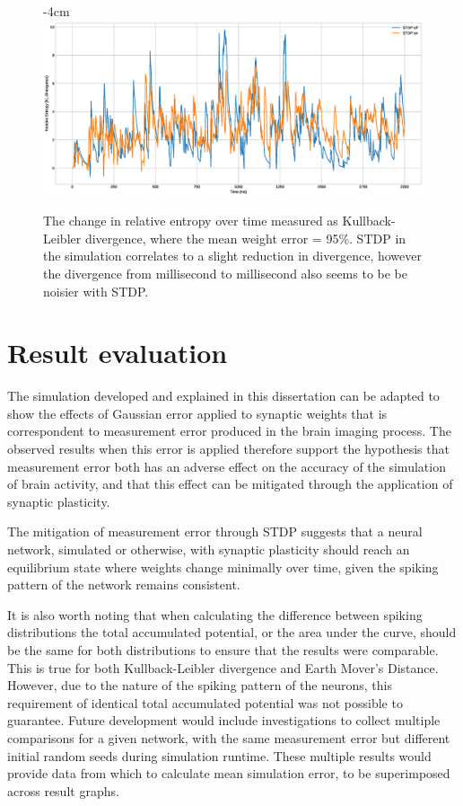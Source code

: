 \begin{figure}[h!]
    \centering
    \addtolength{\leftskip} {-4cm}
    \addtolength{\rightskip}{-4cm}
    \includegraphics[width=1.6\linewidth]{figures/graphs/RESULT2.eps}
    \caption[Kullback-Leibler divergence over time]{The change in relative entropy over time measured as Kullback-Leibler divergence, where the mean weight error = 95\%. STDP in the simulation correlates to a slight reduction in divergence, however the divergence from millisecond to millisecond also seems to be be noisier with STDP.}
    \label{fig:RES2}
\end{figure}
\FloatBarrier

\section{Result evaluation}

The simulation developed and explained in this dissertation can be adapted to
show the effects of Gaussian error applied to synaptic weights that is
correspondent to measurement error produced in the brain imaging process. The
observed results when this error is applied therefore support the hypothesis
that measurement error both has an adverse effect on the accuracy of the
simulation of brain activity, and that this effect can be mitigated through the
application of synaptic plasticity.

The mitigation of measurement error through STDP suggests that a neural
network, simulated or otherwise, with synaptic plasticity should reach an
equilibrium state where weights change minimally over time, given the spiking pattern of the network remains consistent.

It is also worth noting that when calculating the difference between spiking
distributions the total accumulated potential, or the area under the curve,
should be the same for both distributions to ensure that the results were
comparable. This is true for both Kullback-Leibler divergence and Earth Mover's
Distance. However, due to the nature of the spiking pattern of the neurons, this
requirement of identical total accumulated potential
was not possible to guarantee. Future development would include investigations
to collect multiple comparisons for a given network, with the same measurement
error but different initial random seeds during simulation runtime. These
multiple results would provide data from which to calculate mean simulation
error, to be superimposed across result graphs.

